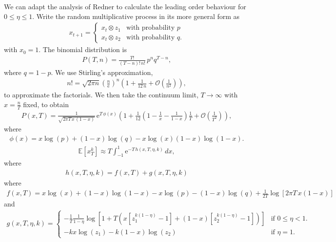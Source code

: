 \documentclass[11pt]{article}
\begin{document}
We can adapt the analysis of Redner \cite{redner1990random} to calculate the leading order behaviour for $0 \leq \eta \leq 1$. Write the random multiplicative process in its more general form as
\begin{align}
\label{eq-etaRandomWalk2}
x_{t+1} = \left\{ 
\begin{array}{ll}
x_t \otimes z_1 & \text{with probability $p$}\\
x_t \otimes z_2  & \text{with probability $q$}.
\end{array}
\right.
\end{align}
with $x_0 = 1$.
The binomial distribution is
\begin{align}
P(T,n) = \frac{T!}{(T-n)!\,n!}\, p^n q^{T-n},
\end{align}
where $q=1-p$.  We use Stirling's approximation,
\begin{align}
n! = \sqrt{2 \pi n} \left( \frac{n}{\mathrm{e}}\right)^n\left(1 + \frac{1}{12\,n} + \mathcal{O}\left(\frac{1}{n^2}\right)\right),
\end{align}
to approximate the factorials. We then take the continuum limit, $T\to \infty$ with $x=\frac{n}{T}$ fixed,
 to obtain 
\begin{align}
P(x, T) = \frac{1}{\sqrt{2 \pi T \,x\,(1-x)}}\,\mathrm{e}^{T\,\phi(x)}\left(1 + \frac{1}{12}\left( 1-\frac{1}{x} - \frac{1}{1-x}\right) \frac{1}{T}   + \mathcal{O}\left(\frac{1}{T^2}\right)\right),
\end{align}
where
\begin{align}
\phi(x) =    x \log(p) +  (1 - x) \log (q)  - x \log(x)  (1 - x) \log(1 - x).
\end{align}
\begin{align}
\label{eq-Laplace}
\mathbb{E}\left[x_T^k\right] \approx T \int_{-1}^{1} \mathrm{e}^{-T\,h(x, T, \eta, k)}\, dx,
\end{align}
where
\begin{align}
\nonumber h(x, T, \eta, k) = f(x,T)   + g(x, T, \eta, k) 
\end{align}
where
\begin{align}
 f(x,T)   =  x \log(x) + (1 - x) \log(1 - x) - 
 x \log(p) - (1 - x) \log (q) + \frac{1}{2 T} \log\left[ 2 \pi T\, x (1 - x)\right]
\end{align}
and
\begin{align}
g(x, T, \eta, k) = \left\{ 
\begin{array}{ll}
 -\frac{1}{T}\frac{1}{1-\eta}\log \left[ 1 + T \left(x \left[z_1^{k (1 - \eta)} - 1\right] + (1 - x) \left[z_2^{k (1 - \eta)} - 1\right]\right) \right] & \text{if $0 \leq \eta < 1$.}\\
  - k x \log(z_1) - k (1 - x) \log(z_2) & \text{if $\eta = 1$}.
\end{array}
\right.
\end{align}
\end{document}
